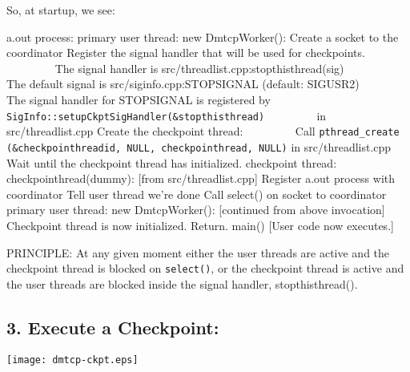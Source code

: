 \documentclass{article}
\begin{document}
So, at startup, we see:

\begin{algorithmic}[1]
\STATE a.out process:
\STATE {\ \ } primary user thread:
\STATE {\ \ \ \ } new DmtcpWorker():
\STATE {\ \ \ \ \ \ } Create a socket to the coordinator
\STATE {\ \ \ \ \ \ } Register the signal handler that will be
	used for checkpoints. \newline
\hbox{\ \ \ \ \ \ \ \ } The signal handler is
		 src/threadlist.cpp:stopthisthread(sig)\newline
\hbox{\ \ \ \ \ \ \ \ } The default signal is src/siginfo.cpp:STOPSIGNAL
		 (default: SIGUSR2)\newline
\hbox{\ \ \ \ \ \ \ \ } The signal handler for STOPSIGNAL is registered by
	 {\tt SigInfo::setupCkptSigHandler(\&stopthisthread)}
\hbox{\ \ \ \ \ \ \ \ } in src/threadlist.cpp
\STATE {\ \ \ \ \ \ } Create the checkpoint thread: \newline
\hbox{\ \ \ \ \ \ \ \ } Call
	{\tt pthread\_create (\&checkpointhreadid, NULL, checkpointhread, NULL)}
	in src/threadlist.cpp
\STATE {\ \ \ \ \ \ } Wait until the checkpoint thread has initialized.
\newline
\STATE {\ \ } checkpoint thread:
\STATE {\ \ \ \ } checkpointhread(dummy):  [from src/threadlist.cpp]
\STATE {\ \ \ \ \ \ } Register a.out process with coordinator
\STATE {\ \ \ \ \ \ } Tell user thread we're done
\STATE {\ \ \ \ \ \ } Call select() on socket to coordinator
\newline
\STATE {\ \ } primary user thread:
\STATE {\ \ \ \ } new DmtcpWorker():  [continued from above invocation]
\STATE {\ \ \ \ \ \ } Checkpoint thread is now initialized.  Return.
\STATE {\ \ \ \ } main()  [User code now executes.]
\end{algorithmic}

\bigskip
\noindent
PRINCIPLE:  At any given moment either the user threads are active and
	the checkpoint thread is blocked on {\tt select()}, or
	the checkpoint thread is active and the user threads are
	blocked inside the signal handler, stopthisthread().




\newpage

\subsection*{3. Execute a Checkpoint:}

\begin{center}
\texttt{[image: dmtcp-ckpt.eps]}
\end{center}
\end{document}
